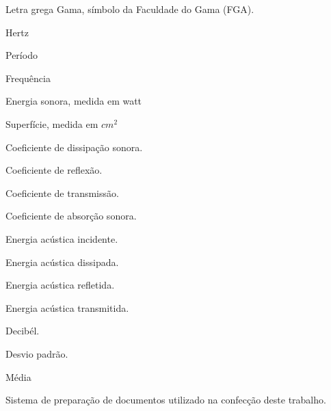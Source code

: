 \begin{simbolos}
  	\item[$ \gamma $] 		Letra grega Gama, símbolo da Faculdade do Gama (FGA).
	\item[Hz] 				Hertz
	\item[T] 				Período
	\item[f] 				Frequência
	\item[W] 				Energia sonora, medida em watt
	\item[S] 				Superfície, medida em $ cm^{2} $
	\item[$ \downpropto $] 	Coeficiente de dissipação sonora.
	\item[$ \varrho $] 		Coeficiente de reflexão.
	\item[$ \tau $] 			Coeficiente de transmissão.
	\item[$ \propto $] 		Coeficiente de absorção sonora.
	\item[$ E_{i} $] 		Energia acústica incidente.
	\item[$ E_{d} $] 		Energia acústica dissipada.
	\item[$ E_{r} $] 		Energia acústica refletida.
	\item[$ E_{t} $] 		Energia acústica transmitida.
	\item[dB]				Decibél.
	\item[$ \sigma $]		Desvio padrão.
	\item[$ \mu $]			Média
	\item[\LaTeX] Sistema de preparação de documentos utilizado na confecção deste trabalho.

\end{simbolos}
